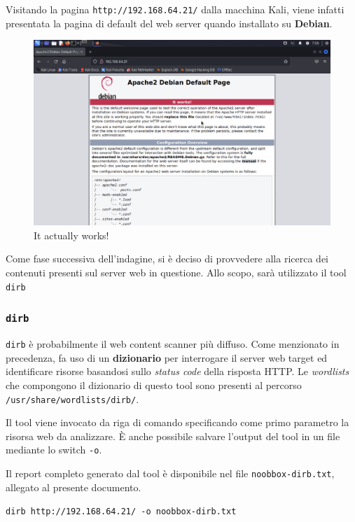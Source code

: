 \documentclass[a4paper, 12pt, oneside]{article}
\begin{document}
Visitando la pagina \texttt{http://192.168.64.21/} dalla macchina Kali, viene infatti presentata la pagina di default del web server quando installato su \textbf{Debian}.
\newpage

\begin{figure}[h!]
    \centering
    \includegraphics[width=\textwidth]{img/itworks.png}
    \caption{It actually works!}
\end{figure}

Come fase successiva dell'indagine, si è deciso di provvedere alla ricerca dei contenuti presenti sul server web in questione. Allo scopo, sarà utilizzato il tool \texttt{dirb}

\subsubsection{\texttt{dirb}}
\texttt{dirb} è probabilmente il web content scanner più diffuso. 
Come menzionato in precedenza, fa uso di un \textbf{dizionario} per interrogare il server web target ed identificare risorse basandosi sullo \textit{status code} della risposta HTTP. 
Le \textit{wordlists} che compongono il dizionario di questo tool sono presenti al percorso \texttt{/usr/share/wordlists/dirb/}.

Il tool viene invocato da riga di comando specificando come primo parametro la risorsa web da analizzare. È anche possibile salvare l'output del tool in un file mediante lo switch \texttt{-o}. 

Il report completo generato dal tool è disponibile nel file \texttt{noobbox-dirb.txt}, allegato al presente documento.

\begin{center}
    \texttt{dirb http://192.168.64.21/ -o noobbox-dirb.txt}
\end{center}
\end{document}
